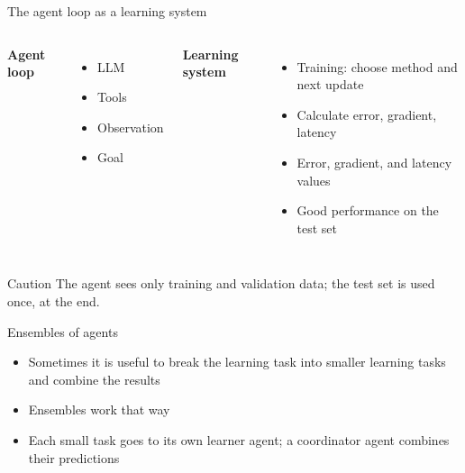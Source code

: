 \documentclass[aspectratio=169]{beamer}
\begin{document}
\begin{frame}{The agent loop as a learning system}
  \begin{columns}[T]
    \textbf{Agent loop}
    \begin{itemize}
      \item LLM
      \item Tools
      \item Observation
      \item Goal
    \end{itemize}
    \textbf{Learning system}
    \begin{itemize}
      \item Training: choose method and next update
      \item Calculate error, gradient, latency
      \item Error, gradient, and latency values
      \item Good performance on the test set
    \end{itemize}
  \end{columns}
  \vspace{0.6cm}
  \begin{alertblock}{Caution}
    The agent sees only training and validation data; the test set is used once, at the end.
  \end{alertblock}
\end{frame}

\begin{frame}{Ensembles of agents}
  \begin{itemize}
    \item Sometimes it is useful to break the learning task into smaller learning tasks and combine the results
    \item Ensembles work that way
    \item Each small task goes to its own learner agent; a coordinator agent combines their predictions
  \end{itemize}
  \vspace{0.3cm}
  \centering
\end{frame}
\end{document}
